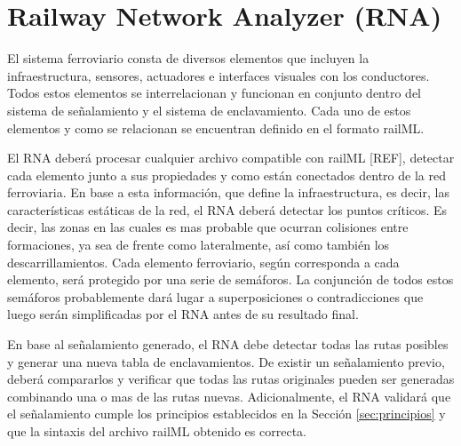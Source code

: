 \chapter{Railway Network Analyzer (RNA)}
    \label{sec:RNA}

    El sistema ferroviario consta de diversos elementos que incluyen la infraestructura, sensores, actuadores  e interfaces visuales con los conductores. Todos estos elementos se interrelacionan y funcionan en conjunto dentro del sistema de señalamiento y el sistema de enclavamiento. Cada uno de estos elementos y como se relacionan se encuentran definido en el formato railML. 

    El RNA deberá procesar cualquier archivo compatible con railML [REF], detectar cada elemento junto a sus propiedades y como están conectados dentro de la red ferroviaria. En base a esta información, que define la infraestructura, es decir, las características estáticas de la red, el RNA deberá detectar los puntos críticos. Es decir, las zonas en las cuales es mas probable que ocurran colisiones entre formaciones, ya sea de frente como lateralmente, así como también los descarrillamientos. Cada elemento ferroviario, según corresponda a cada elemento, será protegido por una serie de semáforos. La conjunción de todos estos semáforos probablemente dará lugar a superposiciones o contradicciones que luego serán simplificadas por el RNA antes de su resultado final.

    En base al señalamiento generado, el RNA debe detectar todas las rutas posibles y generar una nueva tabla de enclavamientos. De existir un señalamiento previo, deberá compararlos y verificar que todas las rutas originales pueden ser generadas combinando una o mas de las rutas nuevas. Adicionalmente, el RNA validará que el señalamiento cumple los principios establecidos en la Sección \ref{sec:principios} y que la sintaxis del archivo railML obtenido es correcta.    

    
    
    
    
    
    